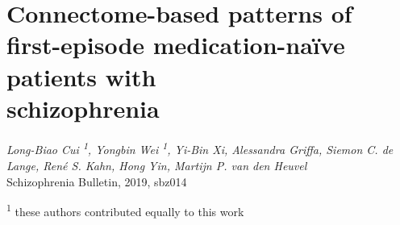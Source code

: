 \pagestyle{MyStyle}

\chapter[Connectome-based patterns of first-episode medication-naïve patients with schizophrenia]{Connectome-based patterns of first-episode medication-naïve patients with \\schizophrenia}


\label{ch:rcscz}

\begin{refsection}

\begin{flushright}
\textit{Long-Biao Cui \textsuperscript{1}, Yongbin Wei \textsuperscript{1}, Yi-Bin Xi, Alessandra Griffa, Siemon C. de Lange, René S. Kahn, Hong Yin, Martijn P. van den Heuvel}\\
Schizophrenia Bulletin, 2019, sbz014

\vspace{5 mm}

\textsuperscript{1} these authors contributed equally to this work\\

\vspace{7 mm}

\end{flushright}

\newpage

\end{refsection}
